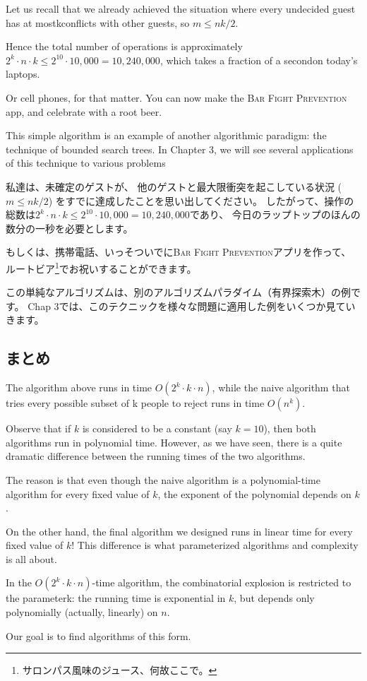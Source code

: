 \documentclass{jsarticle}
\begin{document}
\begin{screen}
    Let us recall that we already achieved the situation where every undecided guest has at mostkconflicts with other guests, so $m \leq nk/2$. 

    Hence the total number of operations is approximately $2^k \cdot n \cdot k \leq 2^{10} \cdot 10,000 = 10,240,000$, 
    which takes a fraction of a secondon today’s laptops. 
    
    Or cell phones, for that matter. You can now make the \textsc{Bar Fight Prevention} app, and celebrate with a root beer. 
    
    This simple algorithm is an example of another algorithmic paradigm: the technique of bounded search trees. In Chapter 3, we will see several applications of this technique to various problems        
\end{screen}

私達は、未確定のゲストが、
他のゲストと最大限衝突を起こしている状況 ($m \leq nk/2$) をすでに達成したことを思い出してください。
したがって、操作の総数は$2^k \cdot n \cdot k \leq 2^{10} \cdot 10,000 = 10,240,000$であり、
今日のラップトップのほんの数分の一秒を必要とします。

もしくは、携帯電話、いっそついでに\textsc{Bar Fight Prevention}アプリを作って、
ルートビア\footnote{サロンパス風味のジュース、何故ここで。}でお祝いすることができます。

この単純なアルゴリズムは、別のアルゴリズムパラダイム（有界探索木）の例です。
Chap 3では、このテクニックを様々な問題に適用した例をいくつか見ていきます。

\newpage

\subsection{まとめ}
\begin{screen}

    The algorithm above runs in time $ O(2^k \cdot k \cdot n)$, while the naive algorithm that tries every possible subset of k people to reject runs in time $O(n^k)$.

    Observe that if $k$ is considered to be a constant (say $k=10$), then both algorithms run in polynomial time. 
    However, as we have seen, there is a quite dramatic difference between the running times of the two algorithms. 
    
    The reason is that even though the naive algorithm is a polynomial-time algorithm for every fixed value of $k$,
     the exponent of the polynomial depends on $k$.
    
    On the other hand, the final algorithm we designed runs in linear time for every fixed value of $k$! 
    This difference is what parameterized algorithms and complexity is all about. 
    
    In the $O(2^k \cdot k \cdot n)$-time algorithm, 
    the combinatorial explosion is restricted to the parameterk: 
    the running time is exponential in $k$, but depends only polynomially (actually, linearly) on $n$. 
    
    Our goal is to find algorithms of this form.
    
\end{screen}
\end{document}
